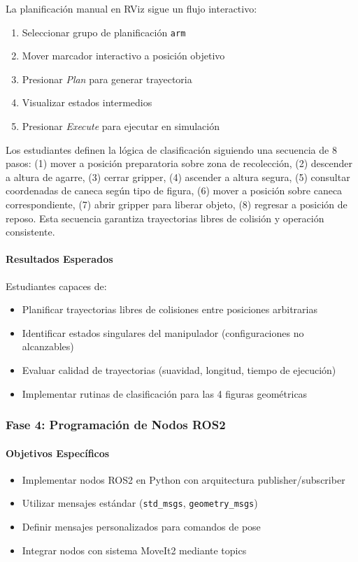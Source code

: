 La planificación manual en RViz sigue un flujo interactivo:
\begin{enumerate}
    \item Seleccionar grupo de planificación \texttt{arm}
    \item Mover marcador interactivo a posición objetivo
    \item Presionar \textit{Plan} para generar trayectoria
    \item Visualizar estados intermedios
    \item Presionar \textit{Execute} para ejecutar en simulación
\end{enumerate}

Los estudiantes definen la lógica de clasificación siguiendo una secuencia de 8 pasos: (1) mover a posición preparatoria sobre zona de recolección, (2) descender a altura de agarre, (3) cerrar gripper, (4) ascender a altura segura, (5) consultar coordenadas de caneca según tipo de figura, (6) mover a posición sobre caneca correspondiente, (7) abrir gripper para liberar objeto, (8) regresar a posición de reposo. Esta secuencia garantiza trayectorias libres de colisión y operación consistente.

\paragraph{Resultados Esperados}

Estudiantes capaces de:
\begin{itemize}
    \item Planificar trayectorias libres de colisiones entre posiciones arbitrarias
    \item Identificar estados singulares del manipulador (configuraciones no alcanzables)
    \item Evaluar calidad de trayectorias (suavidad, longitud, tiempo de ejecución)
    \item Implementar rutinas de clasificación para las 4 figuras geométricas
\end{itemize}

\subsubsection{Fase 4: Programación de Nodos ROS2}

\paragraph{Objetivos Específicos}
\begin{itemize}
    \item Implementar nodos ROS2 en Python con arquitectura publisher/subscriber
    \item Utilizar mensajes estándar (\texttt{std\_msgs}, \texttt{geometry\_msgs})
    \item Definir mensajes personalizados para comandos de pose
    \item Integrar nodos con sistema MoveIt2 mediante topics
\end{itemize}

